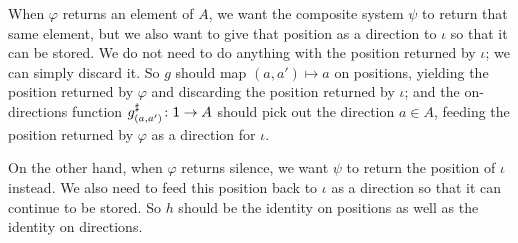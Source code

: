 \documentclass[Book-Poly]{subfiles}
\begin{document}
\begin{example}[Repeater]
When $\varphi$ returns an element of $A$, we want the composite system $\psi$ to return that same element, but we also want to give that position as a direction to $\iota$ so that it can be stored.
We do not need to do anything with the position returned by $\iota$; we can simply discard it.
So $g$ should map $(a,a')\mapsto a$ on positions, yielding the position returned by $\varphi$ and discarding the position returned by $\iota$; and the on-directions function $g^\sharp_{(a,a')}\colon\textsf{1}\to A$ should pick out the direction $a\in A$, feeding the position returned by $\varphi$ as a direction for $\iota$.

On the other hand, when $\varphi$ returns silence, we want $\psi$ to return the position of $\iota$ instead.
We also need to feed this position back to $\iota$ as a direction so that it can continue to be stored.
So $h$ should be the identity on positions as well as the identity on directions.
\end{example}
\end{document}
